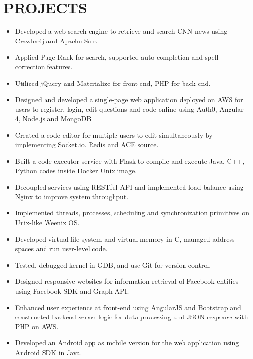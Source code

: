 \section{PROJECTS}


{
	{\begin{itemize}
		\item Developed a web search engine to retrieve and search CNN news using Crawler4j and Apache Solr.
		\item Applied Page Rank for search, supported auto completion and spell correction features.
		\item Utilized jQuery and Materialize for front-end, PHP for back-end.
  	\end{itemize}
  }
}

{
	{\begin{itemize}
		\item Designed and developed a single-page web application deployed on AWS for users to register, login, edit questions and code online using Auth0, Angular 4, Node.js and MongoDB.
		\item Created a code editor for multiple users to edit simultaneously by implementing Socket.io, Redis and ACE source.
		\item Built a code executor service with Flask to compile and execute Java, C++, Python codes inside Docker Unix image.
		\item Decoupled services using RESTful API and implemented load balance using Nginx to improve system throughput.
  	\end{itemize}
  }
}

{
	{\begin{itemize}
		\item Implemented threads, processes, scheduling and synchronization primitives on Unix-like Weenix OS.
		\item Developed virtual file system and virtual memory in C, managed address spaces and run user-level code.
		\item Tested, debugged kernel in GDB, and use Git for version control.
  	\end{itemize}
  }
}

{
	{\begin{itemize}
		\item Designed responsive websites for information retrieval of Facebook entities using Facebook SDK and Graph API.
		\item Enhanced user experience at front-end using AngularJS and Bootstrap and constructed backend server logic for data processing and JSON response with PHP on AWS.
		\item Developed an Android app as mobile version for the web application using Android SDK in Java.
  	\end{itemize}
  }
}

